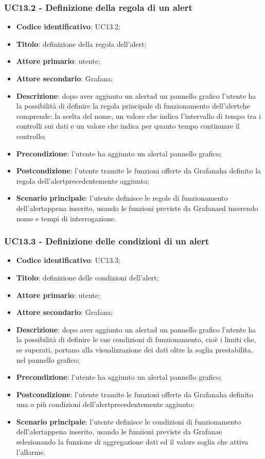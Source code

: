 \subsubsection{UC13.2 - Definizione della regola di un alert}
\begin{itemize}
	\item \textbf{Codice identificativo}: UC13.2;
	\item \textbf{Titolo}: definizione della regola dell'alert\glo;
	\item \textbf{Attore primario}: utente;
	\item \textbf{Attore secondario}: Grafana\glo;
	\item \textbf{Descrizione}: dopo aver aggiunto un alert\glosp ad un pannello grafico l'utente ha la possibilità di definire la regola principale di funzionamento dell'alert\glosp che comprende: la scelta del nome, un valore che indica l'intervallo di tempo tra i controlli sui dati e un valore che indica per quanto tempo continuare il controllo;
	\item \textbf{Precondizione}: l'utente ha aggiunto un alert\glosp al pannello grafico;
	\item \textbf{Postcondizione}: l'utente tramite le funzioni offerte da Grafana\glosp ha definito la regola dell'alert\glosp precedentemente aggiunto;
	\item \textbf{Scenario principale}: l'utente definisce le regole di funzionamento dell'alert\glosp appena inserito, usando le funzioni previste da Grafana\glosp ed inserendo nome e tempi di interrogazione.
\end{itemize}

\subsubsection{UC13.3 - Definizione delle condizioni di un alert}
\begin{itemize}
	\item \textbf{Codice identificativo}: UC13.3;
	\item \textbf{Titolo}: definizione delle condizioni dell'alert\glo;
	\item \textbf{Attore primario}: utente;
	\item \textbf{Attore secondario}: Grafana\glo;
	\item \textbf{Descrizione}: dopo aver aggiunto un alert\glosp ad un pannello grafico l'utente ha la possibilità di definire le sue condizioni di funzionamento, cioè i limiti che, se superati, portano alla visualizzazione dei dati oltre la soglia prestabilita, nel pannello grafico;
	\item \textbf{Precondizione}: l'utente ha aggiunto un alert\glosp al pannello grafico;
	\item \textbf{Postcondizione}: l'utente tramite le funzioni offerte da Grafana\glosp ha definito una o più condizioni dell'alert\glosp precedentemente aggiunto;
	\item \textbf{Scenario principale}: l'utente definisce le condizioni di funzionamento dell'alert\glosp appena inserito, usando le funzioni previste da Grafana\glosp e selezionando la funzione di aggregazione dati ed il valore soglia che attiva l'allarme.
\end{itemize}

